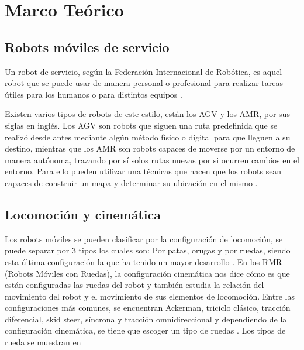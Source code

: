 
\chapter{Marco Teórico}
\label{cap:marco-teorico}
\section{Robots móviles de servicio}
\label{sec:robot-movil-de-servicio}

Un robot de servicio, según la Federación Internacional de Robótica, es aquel robot que se puede usar de manera personal o profesional para realizar tareas útiles para los humanos o para distintos equipos \cite{MT1}.

Existen varios tipos de robots de este estilo, están los AGV y los AMR, por sus siglas en inglés. Los AGV son robots que siguen una ruta predefinida que se realizó desde antes mediante algún método físico o digital para que lleguen a su destino, mientras que los AMR son robots capaces de moverse por un entorno de manera autónoma, trazando por sí solos rutas nuevas por si ocurren cambios en el entorno. Para ello pueden utilizar una técnicas que hacen que los robots sean capaces de construir un mapa y determinar su ubicación en el mismo \cite{MT2}.


\section{Locomoción y cinemática}
\label{sec:locomocion-y-cinematica}

Los robots móviles se pueden clasificar por la configuración de locomoción, se puede separar por 3 tipos los cuales son: Por patas, orugas y por ruedas, siendo esta última configuración la que ha tenido un mayor desarrollo \cite{MT3}. En los RMR (Robots Móviles con Ruedas), la configuración cinemática nos dice cómo es que están configuradas las ruedas del robot y también estudia la relación del movimiento del robot y el movimiento de sus elementos de locomoción. Entre las configuraciones más comunes, se encuentran Ackerman, triciclo clásico, tracción diferencial, skid steer, síncrona y tracción omnidireccional y dependiendo de la configuración cinemática, se tiene que escoger un tipo de ruedas \cite{MT3}. Los tipos de rueda se muestran en  

